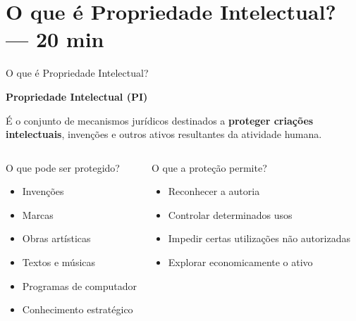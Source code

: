 \documentclass[9pt]{beamer}
\begin{document}
\section{O que é Propriedade Intelectual? — 20 min}

\begin{frame}{O que é Propriedade Intelectual?}

  \begin{center}
    \Large
    \textbf{Propriedade Intelectual (PI)}
  \end{center}

  \vspace{0.4cm}

  \begin{center}
    \normalsize
    É o conjunto de mecanismos jurídicos destinados a
    \textbf{proteger criações intelectuais},
    invenções e outros ativos resultantes da atividade humana.
  \end{center}

  \vspace{0.5cm}

  \begin{columns}[T]

    \begin{block}{O que pode ser protegido?}
      \small
      \begin{itemize}
        \item Invenções
        \item Marcas
        \item Obras artísticas
        \item Textos e músicas
        \item Programas de computador
        \item Conhecimento estratégico
      \end{itemize}
    \end{block}

    \begin{block}{O que a proteção permite?}
      \small
      \begin{itemize}
        \item Reconhecer a autoria
        \item Controlar determinados usos
        \item Impedir certas utilizações não autorizadas
        \item Explorar economicamente o ativo
      \end{itemize}
    \end{block}


\end{columns}
\end{frame}
\end{document}
